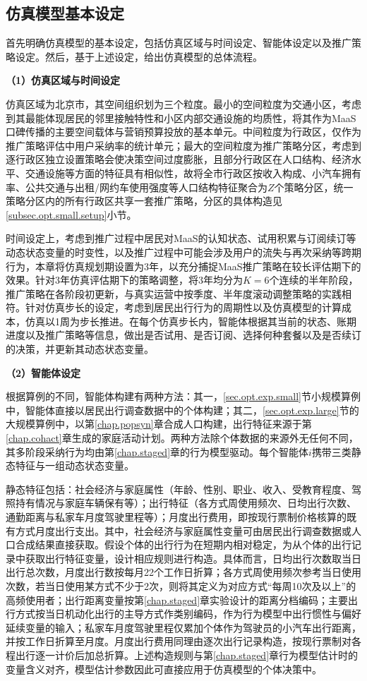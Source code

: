 \subsection{仿真模型基本设定}\label{subsec.opt.abm.framework}

首先明确仿真模型的基本设定，包括仿真区域与时间设定、智能体设定以及推广策略设定。然后，基于上述设定，给出仿真模型的总体流程。

\textbf{（1）仿真区域与时间设定}

仿真区域为北京市，其空间组织划为三个粒度。最小的空间粒度为交通小区，考虑到其最能体现居民的邻里接触特性和小区内部交通设施的均质性，将其作为MaaS口碑传播的主要空间载体与营销预算投放的基本单元。中间粒度为行政区，仅作为推广策略评估中用户采纳率的统计单元；最大的空间粒度为推广策略分区，考虑到逐行政区独立设置策略会使决策空间过度膨胀，且部分行政区在人口结构、经济水平、交通设施等方面的特征具有相似性，故将全市行政区按收入构成、小汽车拥有率、公共交通与出租/网约车使用强度等人口结构特征聚合为$Z$个策略分区，统一策略分区内的所有行政区共享一套推广策略，分区的具体构造见\ref{subsec.opt.small.setup}小节。

时间设定上，考虑到推广过程中居民对MaaS的认知状态、试用积累与订阅续订等动态状态变量的时变性，以及推广过程中可能会涉及用户的流失与再次采纳等跨期行为，本章将仿真规划期设置为3年，以充分捕捉MaaS推广策略在较长评估期下的效果。针对3年仿真评估期下的策略调整，将3年均分为$K=6$个连续的半年阶段，推广策略在各阶段初更新，与真实运营中按季度、半年度滚动调整策略的实践相符。针对仿真步长的设定，考虑到居民出行行为的周期性以及仿真模型的计算成本，仿真以1周为步长推进。在每个仿真步长内，智能体根据其当前的状态、账期进度以及推广策略等信息，做出是否试用、是否订阅、选择何种套餐以及是否续订的决策，并更新其动态状态变量。

\textbf{（2）智能体设定}

根据算例的不同，智能体构建有两种方法：其一，\ref{sec.opt.exp.small}节小规模算例中，智能体直接以居民出行调查数据中的个体构建；其二，\ref{sec.opt.exp.large}节的大规模算例中，以第\ref{chap.popsyn}章合成人口构建，出行特征来源于第\ref{chap.cohact}章生成的家庭活动计划。两种方法除个体数据的来源外无任何不同，其多阶段采纳行为均由第\ref{chap.staged}章的行为模型驱动。每个智能体$i$携带三类静态特征与一组动态状态变量。

静态特征包括：社会经济与家庭属性（年龄、性别、职业、收入、受教育程度、驾照持有情况与家庭车辆保有等）；出行特征（各方式周使用频次、日均出行次数、通勤距离与私家车月度驾驶里程等）；月度出行费用，即按现行票制价格核算的既有方式月度出行支出。其中，社会经济与家庭属性变量可由居民出行调查数据或人口合成结果直接获取。假设个体的出行行为在短期内相对稳定，为从个体的出行记录中获取出行特征变量，设计相应规则进行构造。具体而言，日均出行次数取当日出行总次数，月度出行数按每月22个工作日折算；各方式周使用频次参考当日使用次数，若当日使用某方式不少于2次，则将其定义为对应方式``每周10次及以上''的高频使用者；出行距离变量按第\ref{chap.staged}章实验设计的距离分档编码；主要出行方式按当日机动化出行的主导方式作类别编码，作为行为模型中出行惯性与偏好延续变量的输入；私家车月度驾驶里程仅累加个体作为驾驶员的小汽车出行距离，并按工作日折算至月度。月度出行费用同理由逐次出行记录构造，按现行票制对各程出行逐一计价后加总折算。上述构造规则与第\ref{chap.staged}章行为模型估计时的变量含义对齐，模型估计参数因此可直接应用于仿真模型的个体决策中。

